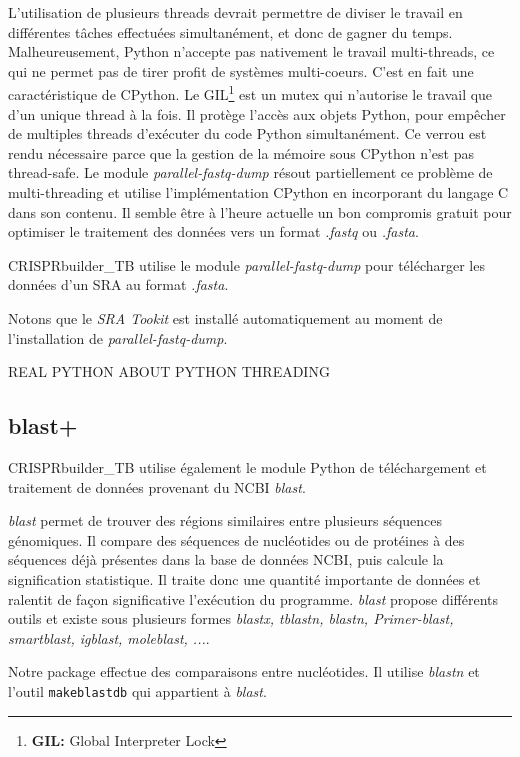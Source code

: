\documentclass[twoside,a4paper,11pt,frenchb,openany]{report}
\begin{document}
L'utilisation de plusieurs threads devrait permettre de diviser le travail en différentes tâches effectuées simultanément, et donc de gagner du temps. Malheureusement, Python n'accepte pas nativement le travail multi-threads, ce qui ne permet pas de tirer profit de systèmes multi-coeurs. C'est en fait une caractéristique de CPython. Le GIL\footnote{\textbf{GIL:} Global Interpreter Lock} est un mutex qui n'autorise le travail que d'un unique thread à la fois. Il protège l'accès aux objets Python, pour empêcher de multiples threads d'exécuter du code Python simultanément. Ce verrou est rendu nécessaire parce que la gestion de la mémoire sous CPython n'est pas thread-safe. Le module \textit{parallel-fastq-dump} résout partiellement ce problème de multi-threading et utilise l'implémentation CPython en incorporant du langage C dans son contenu. Il semble être à l'heure actuelle un bon compromis gratuit pour optimiser le traitement des données vers un format \textit{.fastq} ou \textit{.fasta}. 

CRISPRbuilder\_TB utilise le module \textit{parallel-fastq-dump} pour télécharger les données d'un SRA au format \textit{.fasta}.

Notons que le \textit{SRA Tookit} est installé automatiquement au moment de l'installation de \textit{parallel-fastq-dump}.



REAL PYTHON ABOUT PYTHON THREADING




\subsection{blast+}

CRISPRbuilder\_TB utilise également le module Python de téléchargement et traitement de données provenant du NCBI \textit{blast}.

\textit{blast} permet de trouver des régions similaires entre plusieurs séquences génomiques.  Il compare des séquences de nucléotides ou de protéines à des séquences déjà présentes dans la base de données NCBI, puis calcule la signification statistique. Il traite donc une quantité importante de données et ralentit de façon significative l'exécution du programme. \textit{blast} propose différents outils et existe sous plusieurs formes \textit{blastx, tblastn, blastn, Primer-blast, smartblast, igblast, moleblast, ...}.

Notre package effectue des comparaisons entre nucléotides. Il utilise \textit{blastn} et l'outil \texttt{makeblastdb} qui appartient à \textit{blast}. 
\end{document}
